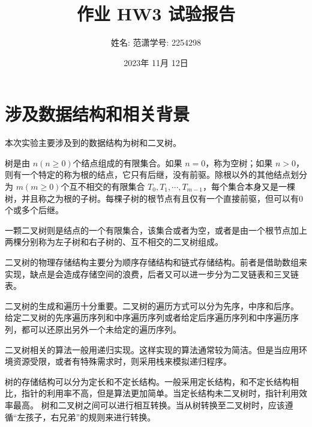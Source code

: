 \documentclass[a4paper,11pt]{article}%
\author{姓名: 范潇\phantom{11}学号: 2254298}
\title{作业 HW3 试验报告}
\date{2023年 11月 12日}
\begin{document}
\maketitle
\lstset{breaklines}%
		\lstset{extendedchars=false}%
\pagestyle{plain}%
\section{涉及数据结构和相关背景}
本次实验主要涉及到的数据结构为树和二叉树。

树是由 $n(n\geq 0)$个结点组成的有限集合。如果 $n=0$，称为空树；如果 $n>0$，则有一个特定的称为根的结点，它只有后继，没有前驱。除根以外的其他结点划分为 $m(m\geq 0)$个互不相交的有限集合 $T_0,T_1,\cdots,T_{m-1}$，每个集合本身又是一棵树，并且称之为根的子树。每棵子树的根节点有且仅有一个直接前驱，但可以有0个或多个后继。

一颗二叉树则是结点的一个有限集合，该集合或者为空，或者是由一个根节点加上两棵分别称为左子树和右子树的、互不相交的二叉树组成。

二叉树的物理存储结构主要分为顺序存储结构和链式存储结构。前者是借助数组来实现，缺点是会造成存储空间的浪费，后者又可以进一步分为二叉链表和三叉链表。

二叉树的生成和遍历十分重要。二叉树的遍历方式可以分为先序，中序和后序。
给定二叉树的先序遍历序列和中序遍历序列或者给定后序遍历序列和中序遍历序列，都可以还原出另外一个未给定的遍历序列。

二叉树相关的算法一般用递归实现。这样实现的算法通常较为简洁。但是当应用环境资源受限，或者有特殊需求时，则采用栈来模拟递归程序。

树的存储结构可以分为定长和不定长结构。一般采用定长结构，和不定长结构相比，指针的利用率不高，但是算法更加简单。当定长结构未二叉树时，指针利用效率最高。
树和二叉树之间可以进行相互转换。当从树转换至二叉树时，应该遵循“左孩子，右兄弟”的规则来进行转换。
\end{document}
